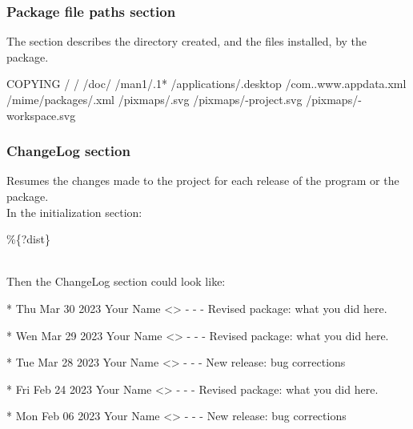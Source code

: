 \clearpage
\subsubsection{Package file paths section}
\label{rpmfiles}

The  section describes the directory created, and the files installed, by the package.
{\footnotesize{
\begin{script}
 COPYING
/
/
/doc/
/man1/.1*
/applications/.desktop
/com..www.appdata.xml
/mime/packages/.xml
/pixmaps/.svg
/pixmaps/-project.svg
/pixmaps/-workspace.svg
\end{script}
}}

\clearpage
\subsubsection{ChangeLog section}
\label{rpmlog}

Resumes the changes made to the project for each release of the program or the package. \\[0.25cm]
In the initialization section:
{\footnotesize{
\begin{script}
   
   \%\{?dist\}
\end{script}
}}
\\
\noindent Then the ChangeLog section could look like:
{\footnotesize{
\begin{script}
* Thu Mar 30 2023 Your Name <\email> - -
- Revised package: what you did here.

* Wen Mar 29 2023 Your Name <\email> - -
- Revised package: what you did here.

* Tue Mar 28 2023 Your Name <\email> - -
- New release: bug corrections

* Fri Feb 24 2023 Your Name <\email> - -
- Revised package: what you did here.

* Mon Feb 06 2023 Your Name <\email> - -
- New release: bug corrections
\end{script}
}}

